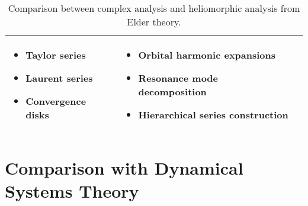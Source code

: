 \begin{table}[h]
\begin{tabular}{|p{3cm}|p{5cm}|p{5cm}|}
\begin{itemize}
    \item Taylor series
    \item Laurent series
    \item Convergence disks
\end{itemize} &
\begin{itemize}
    \item Orbital harmonic expansions
    \item Resonance mode decomposition
    \item Hierarchical series construction
\end{itemize} \\
\hline
\end{tabular}
\caption{Comparison between complex analysis and heliomorphic analysis from Elder theory.}
\label{tab:complex_comparison}
\end{table}

\section{Comparison with Dynamical Systems Theory}

